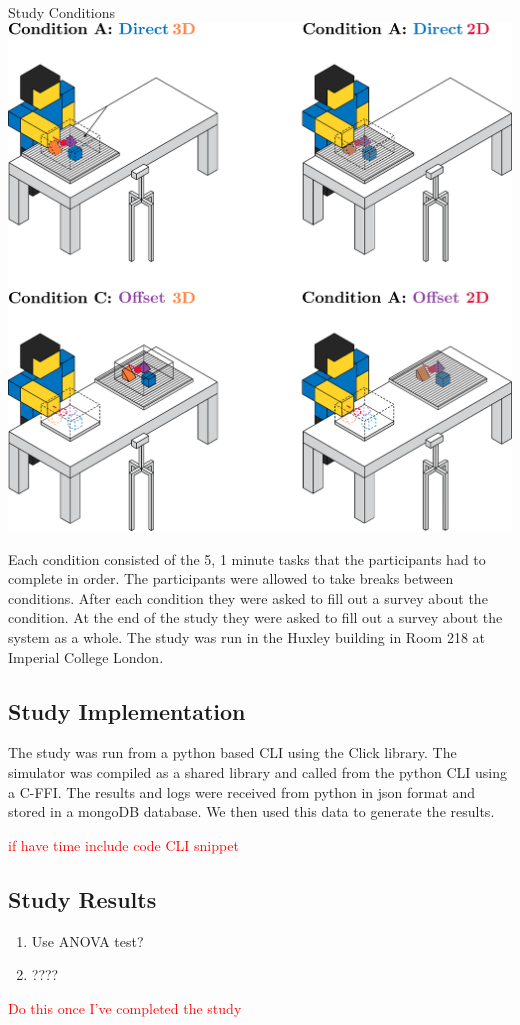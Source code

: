 \begin{figureBox}[label={fig:study-conditions}, width=0.8\linewidth]{Study Conditions}
    \includegraphics[width = 0.8\linewidth]{./implementation/figures/study-conditions.pdf}
\end{figureBox}

Each condition consisted of the 5, 1 minute tasks that the participants had to complete in order. The participants were allowed to take breaks between conditions. After each condition they were asked to fill out a survey about the condition. At the end of the study they were asked to fill out a survey about the system as a whole. The study was run in the Huxley building in Room 218 at Imperial College London.

\subsection{Study Implementation}

The study was run from a python based CLI using the Click library. The simulator was compiled as a shared library and called from the python CLI using a C-FFI. The results and logs were received from python in json format and stored in a mongoDB database. We then used this data to generate the results.

\textcolor{red}{if have time include code CLI snippet}

\subsection{Study Results}
\begin{enumerate}
	\item Use ANOVA test?
	\item ????
\end{enumerate}

\textcolor{red}{Do this once I've completed the study}